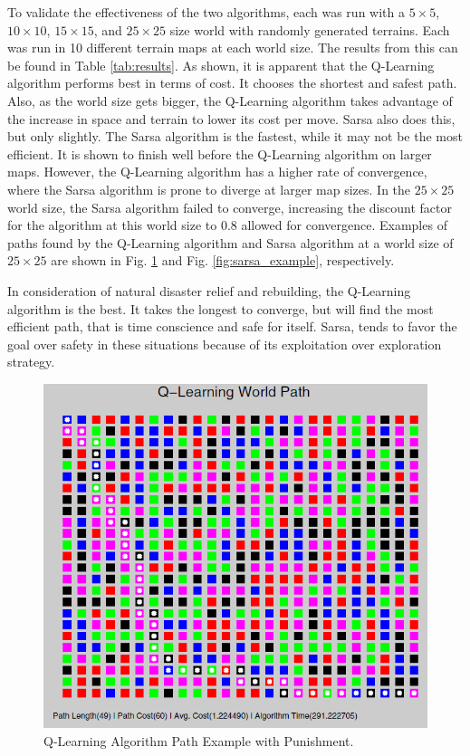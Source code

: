 \documentclass[12pt,american]{report}
\begin{document}
To validate the effectiveness of the two algorithms, each was run with a $5\times  5$, $10\times  10$, $15\times  15$, and $25\times  25$ size world with randomly generated terrains.  Each was run in 10 different terrain maps at each world size.  The results from this can be found in Table \ref{tab:results}.  As shown, it is apparent that the Q-Learning algorithm performs best in terms of cost.  It chooses the shortest and safest path. Also, as the world size gets bigger, the Q-Learning algorithm takes advantage of the increase in space and terrain to lower its cost per move. Sarsa also does this, but only slightly.  The Sarsa algorithm is the fastest, while it may not be the most efficient.  It is shown to finish well before the Q-Learning algorithm on larger maps.  However, the Q-Learning algorithm has a higher rate of convergence, where the Sarsa algorithm is prone to diverge at larger map sizes.  In the $25\times  25$ world size, the Sarsa algorithm failed to converge, increasing the discount factor for the algorithm at this world size to 0.8 allowed for convergence. Examples of paths found by the Q-Learning algorithm and Sarsa algorithm at a world size of $25\times  25$ are shown in Fig. \ref{fig:q-learning example} and Fig. \ref{fig:sarsa_example}, respectively.

In consideration of natural disaster relief and rebuilding, the Q-Learning algorithm is the best.  It takes the longest to converge, but will find the most efficient path, that is time conscience and safe for itself.  Sarsa, tends to favor the goal over safety in these situations because of its exploitation over exploration strategy. 


\begin{figure}
\centering
\includegraphics[scale=.75]{images/q-learning-example.PNG}
\caption{Q-Learning Algorithm Path Example with Punishment.}
\label{fig:q-learning example}
\end{figure}
\end{document}
